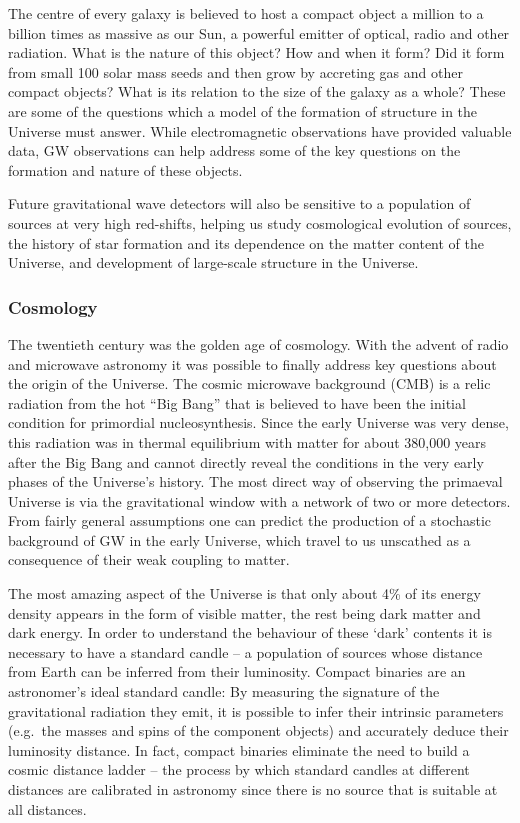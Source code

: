 The centre of every galaxy is believed to host a compact 
object a million to a billion times as massive as our Sun, 
a powerful emitter of optical, radio and other radiation. 
What is the nature of this object? How and when it form? 
Did it form from small 100 solar mass seeds and then grow 
by accreting gas and other compact objects? What is its 
relation to the size of the galaxy as a whole? These are some 
of the questions which a model of the formation of structure in 
the Universe must answer.  While electromagnetic 
observations have provided valuable data, GW observations can 
help address some of the key questions on the formation and 
nature of these objects. 

Future gravitational wave detectors will also be sensitive to 
a population of sources at very high red-shifts, helping us
study cosmological evolution of sources, the history of star 
formation and its dependence on the matter content of 
the Universe, and development of large-scale structure in the 
Universe.

\subsubsection{Cosmology}
The twentieth century was the golden age of cosmology. With 
the advent of radio and microwave astronomy it was possible to 
finally address key questions about the origin of the 
Universe. 
The cosmic microwave background (CMB) is a relic radiation 
from the hot ``Big Bang'' that is believed to have been the 
initial condition for primordial nucleosynthesis. Since the early 
Universe was very dense, this radiation was in thermal 
equilibrium with matter for about 380,000 years after the Big 
Bang and cannot directly reveal the conditions in the very 
early phases of the Universe's history. The most direct way of 
observing the primaeval Universe is via the gravitational 
window with a network of two or more detectors. From fairly 
general assumptions one can predict the production of 
a stochastic background of GW in the early Universe, which travel 
to us unscathed as a consequence of their weak coupling to matter. 

The most amazing aspect of the Universe is that only about 
4\% of its energy density appears in the form of visible matter, 
the rest being dark matter and dark energy. 
In order to understand the behaviour of these `dark' contents 
it is necessary to have a standard candle -- a population of 
sources whose distance from Earth can be inferred from their 
luminosity. 
Compact binaries are an astronomer's ideal standard candle: 
By measuring the signature of the gravitational radiation they emit, 
it is possible to infer their intrinsic parameters (e.g.\ the 
masses and spins of the component objects) and accurately 
deduce their luminosity distance. In fact, compact binaries
eliminate the need to build a cosmic distance ladder -- the
process by which standard candles at different distances are 
calibrated in astronomy since there is no source that is 
suitable at all distances.

